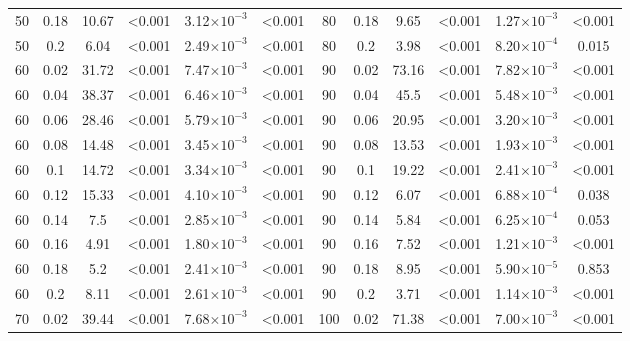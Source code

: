 \documentclass[12pt]{article}
\begin{document}
\begin{table}[hb!]
\begin{tabular}{c c | c c| c c ||c c | c c | c c |}
        50  & 0.18  & 10.67 & \textless0.001  & 3.12$\times10^{-3}$ & \textless0.001  & 80  & 0.18  & 9.65  & \textless0.001  & 1.27$\times10^{-3}$ & \textless0.001  \\
        50  & 0.2 & 6.04  & \textless0.001  & 2.49$\times10^{-3}$ & \textless0.001  & 80  & 0.2 & 3.98  & \textless0.001  & 8.20$\times10^{-4}$ & 0.015 \\
        60  & 0.02  & 31.72 & \textless0.001  & 7.47$\times10^{-3}$ & \textless0.001  & 90  & 0.02  & 73.16 & \textless0.001  & 7.82$\times10^{-3}$ & \textless0.001  \\
        60  & 0.04  & 38.37 & \textless0.001  & 6.46$\times10^{-3}$ & \textless0.001  & 90  & 0.04  & 45.5  & \textless0.001  & 5.48$\times10^{-3}$ & \textless0.001  \\
        60  & 0.06  & 28.46 & \textless0.001  & 5.79$\times10^{-3}$ & \textless0.001  & 90  & 0.06  & 20.95 & \textless0.001  & 3.20$\times10^{-3}$ & \textless0.001  \\
        60  & 0.08  & 14.48 & \textless0.001  & 3.45$\times10^{-3}$ & \textless0.001  & 90  & 0.08  & 13.53 & \textless0.001  & 1.93$\times10^{-3}$ & \textless0.001  \\
        60  & 0.1 & 14.72 & \textless0.001  & 3.34$\times10^{-3}$ & \textless0.001  & 90  & 0.1 & 19.22 & \textless0.001  & 2.41$\times10^{-3}$ & \textless0.001  \\
        60  & 0.12  & 15.33 & \textless0.001  & 4.10$\times10^{-3}$ & \textless0.001  & 90  & 0.12  & 6.07  & \textless0.001  & 6.88$\times10^{-4}$ & 0.038 \\
        60  & 0.14  & 7.5 & \textless0.001  & 2.85$\times10^{-3}$ & \textless0.001  & 90  & 0.14  & 5.84  & \textless0.001  & 6.25$\times10^{-4}$ & 0.053 \\
        60  & 0.16  & 4.91  & \textless0.001  & 1.80$\times10^{-3}$ & \textless0.001  & 90  & 0.16  & 7.52  & \textless0.001  & 1.21$\times10^{-3}$ & \textless0.001  \\
        60  & 0.18  & 5.2 & \textless0.001  & 2.41$\times10^{-3}$ & \textless0.001  & 90  & 0.18  & 8.95  & \textless0.001  & 5.90$\times10^{-5}$ & 0.853 \\
        60  & 0.2 & 8.11  & \textless0.001  & 2.61$\times10^{-3}$ & \textless0.001  & 90  & 0.2 & 3.71  & \textless0.001  & 1.14$\times10^{-3}$ & \textless0.001  \\
        70  & 0.02  & 39.44 & \textless0.001  & 7.68$\times10^{-3}$ & \textless0.001  & 100 & 0.02  & 71.38 & \textless0.001  & 7.00$\times10^{-3}$ & \textless0.001  \\

\end{tabular}
\end{table}
\end{document}
